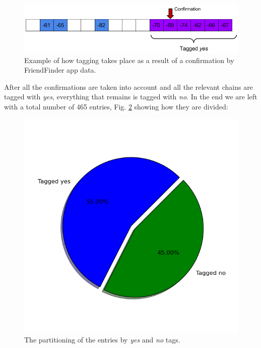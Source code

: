 \begin{figure}[h]
	\begin{center}
		\includegraphics[scale=0.6]{figures/taggedyes.png}
	\end{center}
	
	\caption{Example of how tagging takes place as a result of a confirmation by FriendFinder app data.}
	\label{pic:tag_yes}

\end{figure}

After all the confirmations are taken into account and all the relevant chains are tagged with \textit{yes}, everything that remains is tagged with \textit{no}.  In the end we are left with a total number of 465 entries, Fig. \ref{pic:division} showing how they are divided:

\begin{figure}[h]
	\begin{center}
		\includegraphics[scale=0.6]{figures/division.png}
	\end{center}
	
	\caption{The partitioning of the entries by \textit{yes} and \textit{no} tags.}
	\label{pic:division}

\end{figure}